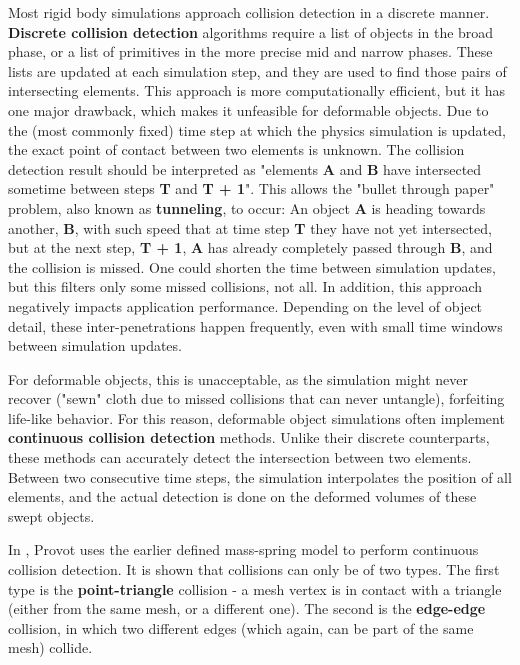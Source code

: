 Most rigid body simulations approach collision detection in a discrete manner. \textbf{Discrete collision detection} algorithms require a list of objects in the broad phase, or a list of primitives in the more precise mid and narrow phases. These lists are updated at each simulation step, and they are used to find those pairs of intersecting elements. This approach is more computationally efficient, but it has one major drawback, which makes it unfeasible for deformable objects. Due to the (most commonly fixed) time step at which the physics simulation is updated, the exact point of contact between two elements is unknown. The collision detection result should be interpreted as "elements \textbf{A} and \textbf{B} have intersected sometime between steps \textbf{T} and \textbf{T + 1}". This allows the "bullet through paper" problem, also known as \textbf{tunneling}, to occur: An object \textbf{A} is heading towards another, \textbf{B}, with such speed that at time step \textbf{T} they have not yet intersected, but at the next step, \textbf{T + 1}, \textbf{A} has already completely passed through \textbf{B}, and the collision is missed. One could shorten the time between simulation updates, but this filters only some missed collisions, not all. In addition, this approach negatively impacts application performance. Depending on the level of object detail, these inter-penetrations happen frequently, even with small time windows between simulation updates.

For deformable objects, this is unacceptable, as the simulation might never recover ("sewn" cloth due to missed collisions that can never untangle), forfeiting life-like behavior. For this reason, deformable object simulations often implement \textbf{continuous collision detection} methods. Unlike their discrete counterparts, these methods can accurately detect the intersection between two elements. Between two consecutive time steps, the simulation interpolates the position of all elements, and the actual detection is done on the deformed volumes of these swept objects.

In \citep{provot97}, Provot uses the earlier defined mass-spring model \citep{provot95} to perform continuous collision detection. It is shown that collisions can only be of two types. The first type is the \textbf{point-triangle} collision - a mesh vertex is in contact with a triangle (either from the same mesh, or a different one). The second is the \textbf{edge-edge} collision, in which two different edges (which again, can be part of the same mesh) collide.

